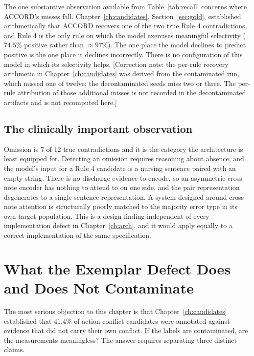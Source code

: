The one substantive observation available from Table~\ref{tab:recall} concerns
where ACCORD's misses fall. Chapter~\ref{ch:candidates}, Section~\ref{sec:gold},
established arithmetically that ACCORD recovers one of the two true Rule 4
contradictions, and Rule 4 is the only rule on which the model exercises
meaningful selectivity ($74.5\%$ positive rather than $\approx 97\%$). The one
place the model declines to predict positive is the one place it declines
incorrectly. There is no configuration of this model in which its selectivity
helps. [Correction note: the per-rule recovery arithmetic in
Chapter~\ref{ch:candidates} was derived from the contaminated run, which missed
one of twelve; the decontaminated seeds miss two or three. The per-rule
attribution of those additional misses is not recorded in the decontaminated
artifacts and is not recomputed here.]

\subsection{The clinically important observation}

Omission is $7$ of $12$ true contradictions and it is the category the
architecture is least equipped for. Detecting an omission requires reasoning
about absence, and the model's input for a Rule 4 candidate is a nursing
sentence paired with an empty string. There is no discharge evidence to encode,
so an asymmetric cross-note encoder has nothing to attend to on one side, and
the pair representation degenerates to a single-sentence representation. A
system designed around cross-note attention is structurally poorly matched to
the majority error type in its own target population. This is a design finding
independent of every implementation defect in Chapter~\ref{ch:arch}, and it
would apply equally to a correct implementation of the same specification.

\section{What the Exemplar Defect Does and Does Not Contaminate}
\label{sec:eval-scoping}

The most serious objection to this chapter is that Chapter~\ref{ch:candidates}
established that $41.4\%$ of action-conflict candidates were annotated against
evidence that did not carry their own conflict. If the labels are contaminated,
are the measurements meaningless? The answer requires separating three distinct
claims.

